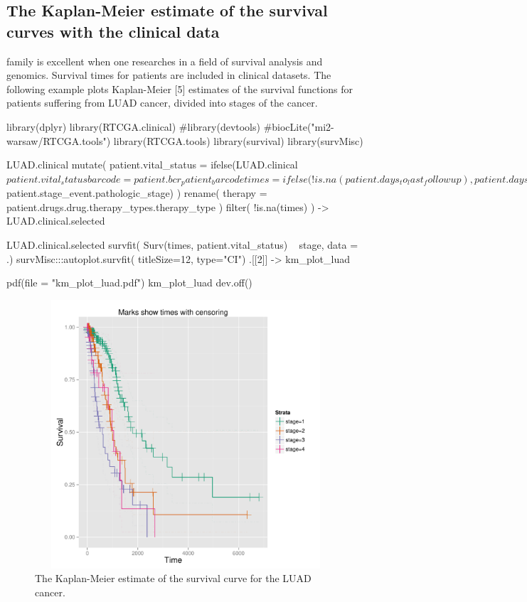 \subsection{The Kaplan-Meier estimate of the survival curves with the
clinical
data}\label{the-kaplan-meier-estimate-of-the-survival-curves-with-the-clinical-data}

 family is excellent when one researches in a field of
survival analysis and genomics. Survival times for patients are included
in clinical datasets. The following example plots Kaplan-Meier {[}5{]}
estimates of the survival functions for patients suffering from LUAD
cancer, divided into stages of the cancer.

\begin{Schunk}
\begin{Sinput}
library(dplyr)
library(RTCGA.clinical)
#library(devtools)
#biocLite("mi2-warsaw/RTCGA.tools") 
library(RTCGA.tools)
library(survival)
library(survMisc)

LUAD.clinical %
   mutate(
      patient.vital_status = ifelse(LUAD.clinical$patient.vital_status %
      barcode = patient.bcr_patient_barcode %
      times = ifelse( !is.na(patient.days_to_last_followup),
                 patient.days_to_last_followup %
                 patient.days_to_death %
      stage = mergeStages(LUAD.clinical$patient.stage_event.pathologic_stage)
   ) %
   rename(
      therapy = patient.drugs.drug.therapy_types.therapy_type
   ) %
   filter( !is.na(times) ) -> LUAD.clinical.selected 

LUAD.clinical.selected %
   survfit( Surv(times, patient.vital_status) ~ stage, data = .) %
   survMisc:::autoplot.survfit( titleSize=12, type="CI") %
   .[[2]] -> km_plot_luad

   pdf(file = "km_plot_luad.pdf")
   km_plot_luad
   dev.off()
\end{Sinput}
\end{Schunk}

\begin{figure}[h!]
\includegraphics[width=14cm, height=10cm]{km_plot_luad.pdf}
\caption{\label{km_plot}The Kaplan-Meier estimate of the survival curve for the LUAD cancer. }
\end{figure}

